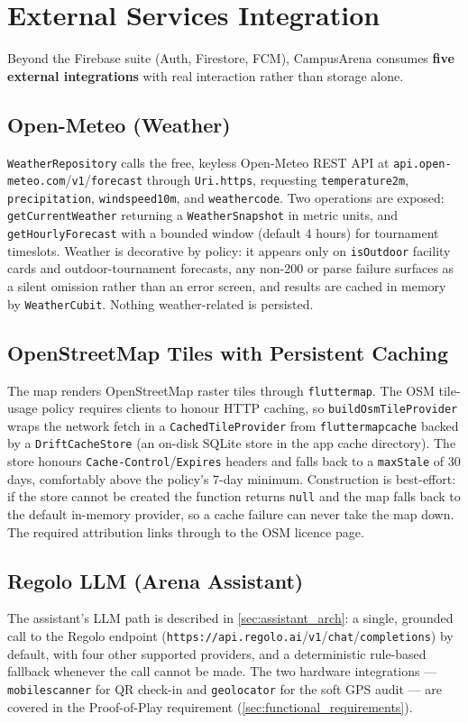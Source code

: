 \documentclass{configurations/polimi3i_thesis}
\renewcommand{\_}{\textunderscore\allowbreak}
\begin{document}
\section{External Services Integration}
\label{sec:external_services}

Beyond the Firebase suite (Auth, Firestore, FCM), CampusArena consumes \textbf{five external integrations} with real interaction rather than storage alone.

\subsection{Open-Meteo (Weather)}
\texttt{WeatherRepository} calls the free, keyless Open-Meteo REST API at \texttt{api.open-meteo.com}\slash\allowbreak\texttt{v1}\slash\allowbreak\texttt{forecast} through \texttt{Uri.https}, requesting \texttt{temperature\_2m}, \texttt{precipitation}, \texttt{wind\_speed\_10m}, and \texttt{weather\_code}. Two operations are exposed: \texttt{getCurrentWeather} returning a \texttt{WeatherSnapshot} in metric units, and \texttt{getHourlyForecast} with a bounded window (default 4 hours) for tournament timeslots. Weather is decorative by policy: it appears only on \texttt{isOutdoor} facility cards and outdoor-tournament forecasts, any non-200 or parse failure surfaces as a silent omission rather than an error screen, and results are cached in memory by \texttt{WeatherCubit}. Nothing weather-related is persisted.

\subsection{OpenStreetMap Tiles with Persistent Caching}
The map renders OpenStreetMap raster tiles through \texttt{flutter\_map}. The OSM tile-usage policy requires clients to honour HTTP caching, so \texttt{buildOsmTileProvider} wraps the network fetch in a \texttt{CachedTileProvider} from \texttt{flutter\_map\_cache} backed by a \texttt{DriftCacheStore} (an on-disk SQLite store in the app cache directory). The store honours \texttt{Cache-Control}/\texttt{Expires} headers and falls back to a \texttt{maxStale} of 30 days, comfortably above the policy's 7-day minimum. Construction is best-effort: if the store cannot be created the function returns \texttt{null} and the map falls back to the default in-memory provider, so a cache failure can never take the map down. The required attribution links through to the OSM licence page.

\subsection{Regolo LLM (Arena Assistant)}
The assistant's LLM path is described in \cref{sec:assistant_arch}: a single, grounded call to the Regolo endpoint (\texttt{https://api.regolo.ai}\slash\allowbreak\texttt{v1}\slash\allowbreak\texttt{chat}\slash\allowbreak\texttt{completions}) by default, with four other supported providers, and a deterministic rule-based fallback whenever the call cannot be made. The two hardware integrations — \texttt{mobile\_scanner} for QR check-in and \texttt{geolocator} for the soft GPS audit — are covered in the Proof-of-Play requirement (\cref{sec:functional_requirements}).
\end{document}
